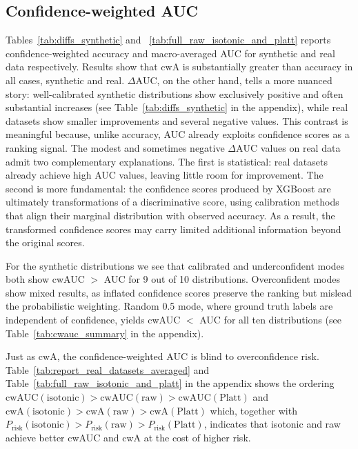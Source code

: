 \documentclass{article}
\theoremstyle{plain}
\theoremstyle{definition}
\theoremstyle{remark}
\begin{document}
\subsection{Confidence-weighted AUC}


Tables~\ref{tab:diffs_synthetic} and ~\ref{tab:full_raw_isotonic_and_platt} reports confidence-weighted accuracy and macro-averaged AUC for synthetic and real data respectively. Results show that $\text{cwA}$ is substantially greater than accuracy in all cases, synthetic and real. $\Delta\text{AUC}$, on the other hand, tells a more nuanced story: well-calibrated synthetic distributions show exclusively positive and often substantial increases  (see Table~\ref{tab:diffs_synthetic} in the appendix), while real datasets show smaller improvements and several negative values. This contrast is meaningful because, unlike accuracy, AUC already exploits confidence scores as a ranking signal.  The modest and sometimes negative $\Delta\text{AUC}$ values on real data admit two complementary explanations. The first is statistical: real datasets already achieve high AUC values, leaving little room for improvement. The second is more fundamental: the confidence scores produced by XGBoost are ultimately transformations of a discriminative score, using calibration methods that align their marginal distribution with observed accuracy. As a result, the transformed confidence scores may carry limited additional information beyond the original scores. 

For the synthetic distributions we see that calibrated and underconfident modes both show cwAUC $>$ AUC for 9 out of 10 distributions. Overconfident modes show mixed results, as inflated confidence scores preserve the ranking but mislead the probabilistic weighting. Random 0.5 mode, where ground truth labels are independent of confidence, yields cwAUC $<$ AUC for all ten distributions (see Table~\ref{tab:cwauc_summary} in the appendix).

Just as $\mathrm{cwA}$, the confidence-weighted AUC is blind to overconfidence risk. Table~\ref{tab:report_real_datasets_averaged} and Table~\ref{tab:full_raw_isotonic_and_platt} in the appendix shows the ordering $\mathrm{cwAUC}(\text{isotonic}) > \mathrm{cwAUC}(\text{raw}) > \mathrm{cwAUC}(\text{Platt})$ and  $\mathrm{cwA}(\text{isotonic}) > \mathrm{cwA}(\text{raw}) > \mathrm{cwA}(\text{Platt})$ which, together with $P_{\mathrm{risk}}(\text{isotonic}) > P_{\mathrm{risk}}(\text{raw}) > P_{\mathrm{risk}}(\text{Platt})$, indicates that isotonic and raw achieve better cwAUC and cwA at the cost of higher risk. 
\end{document}
